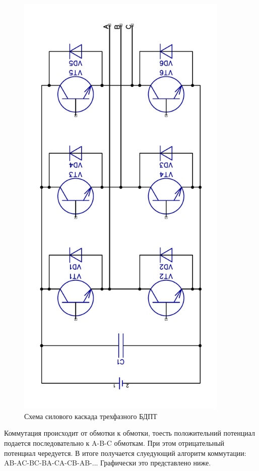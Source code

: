 \documentclass[russian, utf8]{eskdtext}
\begin{document}
\begin{figure} [h!]
	\centering
	\includegraphics[angle = -90, width = 0.9\textwidth]{BITransistors.pdf}
	\caption{Схема силового каскада трехфазного БДПТ}
\end{figure}

Коммутация происходит от обмотки к обмотки, тоесть положительний потенциал подается последовательно к A-B-C обмоткам. При этом отрицательный потенциал чередуется. В итоге получается слуедующий алгоритм коммутации: AB-AC-BC-BA-CA-CB-AB-... Графически это представлено ниже.
\end{document}
